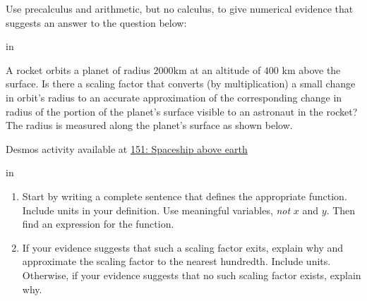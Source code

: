 \documentclass{ximera}
\newcommand{\pskip}{\vskip 0.1 in}
\begin{document}
\begin{question} \label{QK3ef34n3}

Use precalculus and arithmetic, but no calculus, to give numerical evidence that suggests an answer to the question below:

\pskip

A rocket orbits a planet of radius $2000$km at an altitude of $400$ km above the surface. Is there a scaling factor that converts (by multiplication) a small change in orbit's radius to an accurate approximation of the corresponding change in radius of the portion of the planet's surface visible to an astronaut in the rocket? The radius is measured along the planet's surface as shown below.


\begin{onlineOnly}
    \begin{center}
\end{center}
\end{onlineOnly}

Desmos activity available at
\href{https://www.desmos.com/3d/paqpozwuxm}{151: Spaceship above earth}
 

\pskip

\begin{enumerate}

\item Start by writing a complete sentence that defines the appropriate function. Include units in your definition. Use meaningful variables, \emph{not} $x$ and $y$. Then find an expression for the function.

\item If your evidence suggests that such a scaling factor exits, explain why and approximate the scaling factor to the nearest hundredth. Include units. Otherwise, if your evidence suggests that no such scaling factor exists, explain why.

\end{enumerate}
\end{question}
\end{document}
